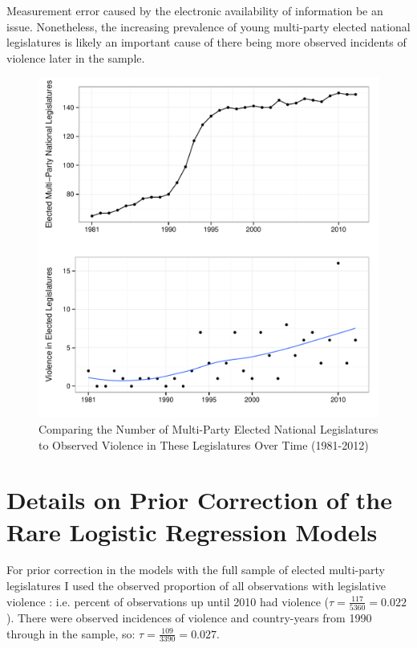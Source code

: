 \documentclass[a4paper]{article}\usepackage[]{graphicx}\usepackage[]{color}
\newenvironment{knitrout}{}{} %
\begin{document}
Measurement error caused by the electronic availability of information be an issue. Nonetheless, the increasing prevalence of young multi-party elected national legislatures is likely an important cause of there being more observed incidents of violence later in the sample.

\begin{figure}

    \begin{center}
\begin{knitrout}
\color{fgcolor}
\includegraphics[width=0.8\linewidth]{figure/compareLegToViolence-1} 

\end{knitrout}
    \end{center}

    \caption{Comparing the Number of Multi-Party Elected National Legislatures to Observed Violence in These Legislatures Over Time (1981-2012)}
    \label{elect_vs_violence}

\end{figure}


\section*{Details on Prior Correction of the Rare Logistic Regression Models}


For prior correction \citep[see][]{KingRareEventsPA2001} in the models with the full sample of elected multi-party legislatures I used the observed proportion of all observations with legislative violence : i.e.  percent of observations up until 2010 had violence ($\tau = \frac{117}{5360} = 0.022$). There were  observed incidences of violence and  country-years from 1990 through  in the sample, so: $\tau = \frac{109}{3390} = 0.027$.
\end{document}
